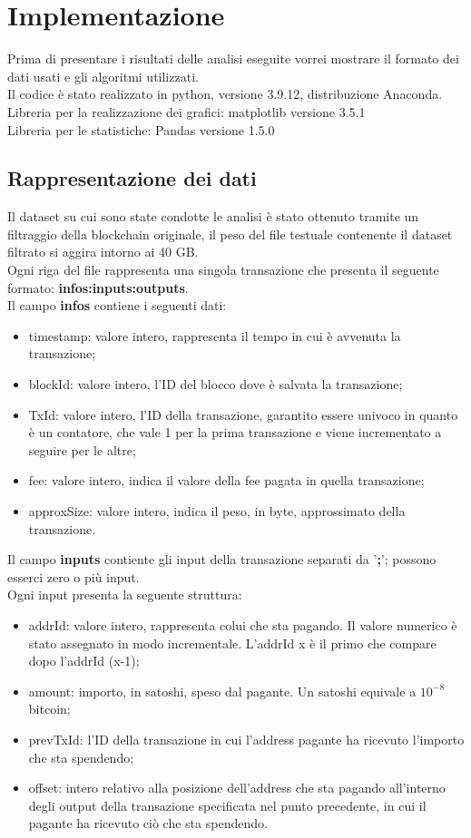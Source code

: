 \chapter{Implementazione}
Prima di presentare i risultati delle analisi eseguite vorrei mostrare il formato dei dati usati e gli algoritmi utilizzati.\\
Il codice è stato realizzato in python, versione 3.9.12, distribuzione Anaconda.\\
Libreria per la realizzazione dei grafici: matplotlib versione 3.5.1\\
Libreria per le statistiche: Pandas versione 1.5.0\\
\section{Rappresentazione dei dati}
Il dataset su cui sono state condotte le analisi è stato ottenuto tramite un filtraggio della blockchain originale, il peso del file testuale contenente il dataset filtrato si aggira intorno ai 40 GB.\\
Ogni riga del file rappresenta una singola transazione che presenta il seguente formato:
\textbf{infos:inputs:outputs}.\\ Il campo \textbf{infos} contiene i seguenti dati:
\begin{itemize}
    \item timestamp: valore intero, rappresenta il tempo in cui è avvenuta la transazione;
    \item blockId: valore intero, l'ID del blocco dove è salvata la transazione;
    \item TxId: valore intero, l'ID della transazione, garantito essere univoco in quanto è un contatore, che vale 1 per la prima transazione e viene incrementato a seguire per le altre;
    \item fee: valore intero, indica il valore della fee pagata in quella transazione;
    \item approxSize: valore intero, indica il peso, in byte, approssimato della transazione.
\end{itemize}
Il campo \textbf{inputs} contiente gli input della transazione separati da '\textbf{;}'; possono esserci zero o più input.\\
Ogni input presenta la seguente struttura:
\begin{itemize}
    \item addrId: valore intero, rappresenta colui che sta pagando. Il valore numerico è stato assegnato in modo incrementale. L'addrId x è il primo che compare dopo l'addrId (x-1);
    \item amount: importo, in satoshi, speso dal pagante. Un satoshi equivale a $10^{-8}$ bitcoin; 
    \item prevTxId: l'ID della transazione in cui l’address pagante ha ricevuto l’importo che sta spendendo;
    \item offset: intero relativo alla posizione dell’address che sta pagando all’interno degli output della transazione specificata nel punto precedente, in cui il pagante ha ricevuto ciò che sta spendendo.
\end{itemize}
